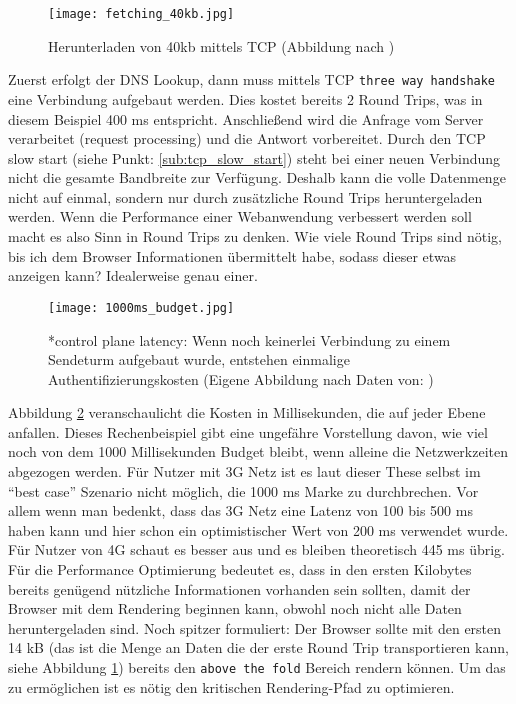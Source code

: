 		\begin{figure}[htbp]
			\begin{center}
				\texttt{[image: fetching\_40kb.jpg]}
				\caption{Herunterladen von 40kb mittels TCP (Abbildung nach \autocite{grigorikTCP})}
				\label{fig:fetching_40kb}
			\end{center}
		\end{figure}

		Zuerst erfolgt der DNS Lookup, dann muss mittels TCP \texttt{three way handshake} eine Verbindung aufgebaut werden. Dies kostet bereits 2 Round Trips, was in diesem Beispiel 400 ms entspricht. Anschließend wird die Anfrage vom Server verarbeitet (request processing) und die Antwort vorbereitet.
		Durch den TCP slow start (siehe Punkt: \ref{sub:tcp_slow_start}) steht bei einer neuen Verbindung nicht die gesamte Bandbreite zur Verfügung. Deshalb kann die volle Datenmenge nicht auf einmal, sondern nur durch zusätzliche Round Trips heruntergeladen werden. Wenn die Performance einer Webanwendung verbessert werden soll macht es also Sinn in Round Trips zu denken. Wie viele Round Trips sind nötig, bis ich dem Browser Informationen übermittelt habe, sodass dieser etwas anzeigen kann? Idealerweise genau einer. 
		
		\begin{figure}[htbp]
			\begin{center}
				\texttt{[image: 1000ms\_budget.jpg]}
				\caption{*control plane latency: Wenn noch keinerlei Verbindung zu einem Sendeturm aufgebaut wurde, entstehen einmalige Authentifizierungskosten (Eigene Abbildung nach Daten von: \autocite{venturebeat}\autocite[p. 7, 12]{grigorikRadio})}
				\label{fig:1000ms_budget}
			\end{center}
		\end{figure}

		Abbildung \ref{fig:1000ms_budget} veranschaulicht die Kosten in Millisekunden, die auf jeder Ebene anfallen. Dieses Rechenbeispiel gibt eine ungefähre Vorstellung davon, wie viel noch von dem 1000 Millisekunden Budget bleibt, wenn alleine die Netzwerkzeiten abgezogen werden. Für Nutzer mit 3G Netz ist es laut dieser These selbst im "`best case"' Szenario nicht möglich, die 1000 ms Marke zu durchbrechen. Vor allem wenn man bedenkt, dass das 3G Netz eine Latenz von 100 bis 500 ms haben kann und hier schon ein optimistischer Wert von 200 ms verwendet wurde. Für Nutzer von 4G schaut es besser aus und es bleiben theoretisch 445 ms übrig.\\
		Für die Performance Optimierung bedeutet es, dass in den ersten Kilobytes bereits genügend nützliche Informationen vorhanden sein sollten, damit der Browser mit dem Rendering beginnen kann, obwohl noch nicht alle Daten heruntergeladen sind. Noch spitzer formuliert: Der Browser sollte mit den ersten 14 kB (das ist die Menge an Daten die der erste Round Trip transportieren kann, siehe Abbildung \ref{fig:fetching_40kb}) bereits den \texttt{above the fold} Bereich rendern können. Um das zu ermöglichen ist es nötig den kritischen Rendering-Pfad zu optimieren.
		
